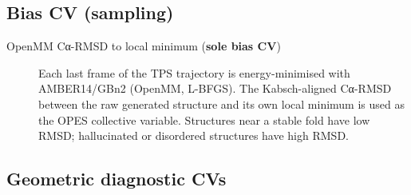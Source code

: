 \documentclass[11pt,a4paper]{article}
\begin{document}
\subsection*{Bias CV (sampling)}
\begin{description}
  \item[OpenMM Cα-RMSD to local minimum (\textbf{sole bias CV})]
    Each last frame of the TPS trajectory is energy-minimised with
    AMBER14/GBn2 (OpenMM, L-BFGS).  The Kabsch-aligned Cα-RMSD between
    the raw generated structure and its own local minimum is used as the
    OPES collective variable.  Structures near a stable fold have low RMSD;
    hallucinated or disordered structures have high RMSD.
\end{description}

\subsection*{Geometric diagnostic CVs}
\end{document}
